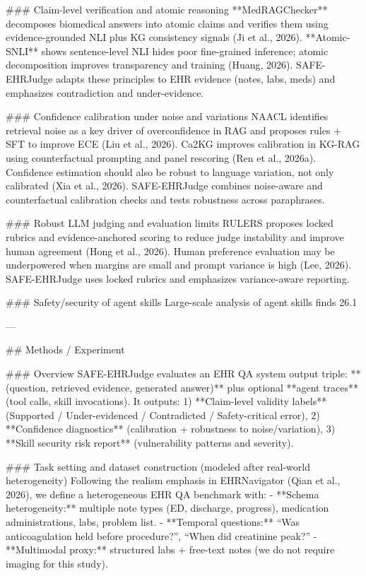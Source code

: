 ### Claim-level verification and atomic reasoning  
**MedRAGChecker** decomposes biomedical answers into atomic claims and verifies them using evidence-grounded NLI plus KG consistency signals (Ji et al., 2026). **Atomic-SNLI** shows sentence-level NLI hides poor fine-grained inference; atomic decomposition improves transparency and training (Huang, 2026). SAFE-EHRJudge adapts these principles to EHR evidence (notes, labs, meds) and emphasizes contradiction and under-evidence.

### Confidence calibration under noise and variations  
NAACL identifies retrieval noise as a key driver of overconfidence in RAG and proposes rules + SFT to improve ECE (Liu et al., 2026). Ca2KG improves calibration in KG-RAG using counterfactual prompting and panel rescoring (Ren et al., 2026a). Confidence estimation should also be robust to language variation, not only calibrated (Xia et al., 2026). SAFE-EHRJudge combines noise-aware and counterfactual calibration checks and tests robustness across paraphrases.

### Robust LLM judging and evaluation limits  
RULERS proposes locked rubrics and evidence-anchored scoring to reduce judge instability and improve human agreement (Hong et al., 2026). Human preference evaluation may be underpowered when margins are small and prompt variance is high (Lee, 2026). SAFE-EHRJudge uses locked rubrics and emphasizes variance-aware reporting.

### Safety/security of agent skills  
Large-scale analysis of agent skills finds 26.1%

---

## Methods / Experiment  

### Overview  
SAFE-EHRJudge evaluates an EHR QA system output triple: **(question, retrieved evidence, generated answer)** plus optional **agent traces** (tool calls, skill invocations). It outputs:  
1) **Claim-level validity labels** (Supported / Under-evidenced / Contradicted / Safety-critical error),  
2) **Confidence diagnostics** (calibration + robustness to noise/variation),  
3) **Skill security risk report** (vulnerability patterns and severity).

### Task setting and dataset construction (modeled after real-world heterogeneity)  
Following the realism emphasis in EHRNavigator (Qian et al., 2026), we define a heterogeneous EHR QA benchmark with:  
- **Schema heterogeneity:** multiple note types (ED, discharge, progress), medication administrations, labs, problem list.  
- **Temporal questions:** “Was anticoagulation held before procedure?”, “When did creatinine peak?”  
- **Multimodal proxy:** structured labs + free-text notes (we do not require imaging for this study).

